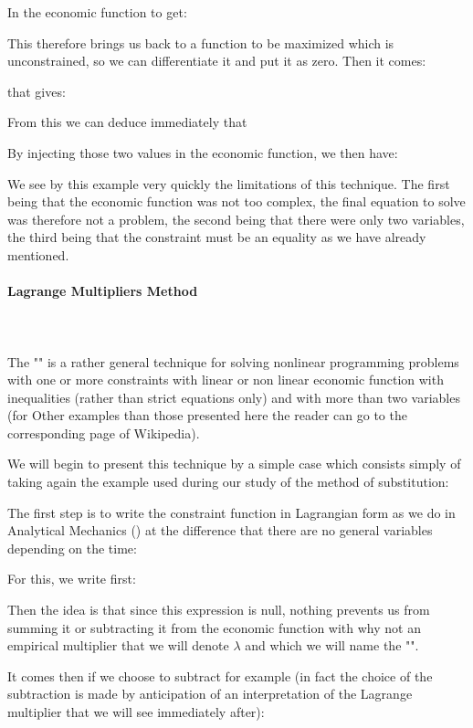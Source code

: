  	In the economic function to get:
	
 	This therefore brings us back to a function to be maximized which is unconstrained, so we can differentiate it and put it as zero. Then it comes:
	
	that gives:
	
	From this we can deduce immediately that
	
 	By injecting those two values in the economic function, we then have:
	
	We see by this example very quickly the limitations of this technique. The first being that the economic function was not too complex, the final equation to solve was therefore not a problem, the second being that there were only two variables, the third being that the constraint must be an equality as we have already mentioned.
	
	
	\paragraph{Lagrange Multipliers Method}\mbox{}\\\\	
	The "" is a rather general technique for solving nonlinear programming problems with one or more constraints with linear or non linear economic function with inequalities (rather than strict equations only) and with more than two variables (for Other examples than those presented here the reader can go to the corresponding page of Wikipedia).

	We will begin to present this technique by a simple case which consists simply of taking again the example used during our study of the method of substitution:
	
	The first step is to write the constraint function in Lagrangian form as we do in Analytical Mechanics () at the difference that there are no general variables depending on the time:
	
	For this, we write first:
	
	Then the idea is that since this expression is null, nothing prevents us from summing it or subtracting it from the economic function with why not an empirical multiplier that we will denote $\lambda$ and which we will name the "".

	It comes then if we choose to subtract for example (in fact the choice of the subtraction is made by anticipation of an interpretation of the Lagrange multiplier that we will see immediately after):
	
